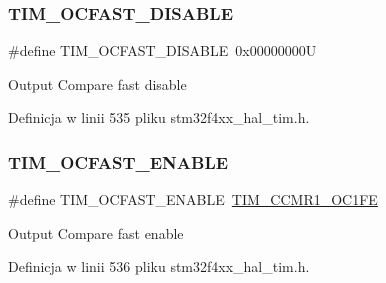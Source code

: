 \subsubsection{\texorpdfstring{T\+I\+M\+\_\+\+O\+C\+F\+A\+S\+T\+\_\+\+D\+I\+S\+A\+B\+LE}{TIM\_OCFAST\_DISABLE}}
{\footnotesize\ttfamily \#define T\+I\+M\+\_\+\+O\+C\+F\+A\+S\+T\+\_\+\+D\+I\+S\+A\+B\+LE~0x00000000U}

Output Compare fast disable 

Definicja w linii 535 pliku stm32f4xx\+\_\+hal\+\_\+tim.\+h.

\mbox{\label{group___t_i_m___output___fast___state_ga445a2c0633ac649e816cf7a16b716d61}} 
\subsubsection{\texorpdfstring{T\+I\+M\+\_\+\+O\+C\+F\+A\+S\+T\+\_\+\+E\+N\+A\+B\+LE}{TIM\_OCFAST\_ENABLE}}
{\footnotesize\ttfamily \#define T\+I\+M\+\_\+\+O\+C\+F\+A\+S\+T\+\_\+\+E\+N\+A\+B\+LE~\hyperlink{group___peripheral___registers___bits___definition_gab9c5878e85ce02c22d8a374deebd1b6e}{T\+I\+M\+\_\+\+C\+C\+M\+R1\+\_\+\+O\+C1\+FE}}

Output Compare fast enable 

Definicja w linii 536 pliku stm32f4xx\+\_\+hal\+\_\+tim.\+h.

